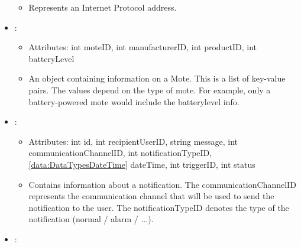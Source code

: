 \begin{itemize}[nolistsep,noitemsep]
\begin{itemize}[noitemsep,nolistsep]
\item[] Represents an Internet Protocol address.
\end{itemize}
\item {}: 
\begin{itemize}[noitemsep,nolistsep]
\item[] Attributes: int moteID, int manufacturerID, int productID, int batteryLevel
\item[] An object containing information on a Mote. This is a list of key-value pairs. The values depend on the type of mote. For example, only a battery-powered mote would include the batterylevel info.
\end{itemize}
\item {}: 
\begin{itemize}[noitemsep,nolistsep]
\item[] Attributes: int id, int recipientUserID, string message, int communicationChannelID, int notificationTypeID, \ref{data:DataTypesDateTime} dateTime, int triggerID, int status
\item[] Contains information about a notification. The communicationChannelID represents the communication channel that will be used to send the notification to the user. The notificationTypeID denotes the type of the notification (normal / alarm / ...).
\end{itemize}
\item {}: 
\begin{itemize}


\end{itemize}
\end{itemize}

